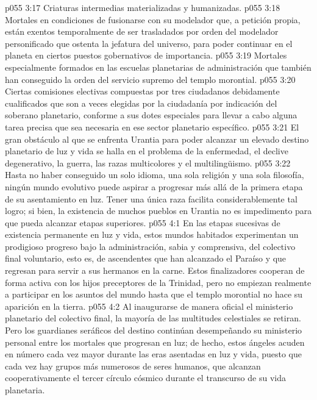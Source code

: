 \vs p055 3:17 Criaturas intermedias materializadas y humanizadas.
\vs p055 3:18 Mortales en condiciones de fusionarse con su modelador que, a petición propia, están exentos temporalmente de ser trasladados por orden del modelador personificado que ostenta la jefatura del universo, para poder continuar en el planeta en ciertos puestos gobernativos de importancia.
\vs p055 3:19 Mortales especialmente formados en las escuelas planetarias de administración que también han conseguido la orden del servicio supremo del templo morontial.
\vs p055 3:20 Ciertas comisiones electivas compuestas por tres ciudadanos debidamente cualificados que son a veces elegidas por la ciudadanía por indicación del soberano planetario, conforme a sus dotes especiales para llevar a cabo alguna tarea precisa que sea necesaria en ese sector planetario específico.
\vs p055 3:21 \pc El gran obstáculo al que se enfrenta Urantia para poder alcanzar un elevado destino planetario de luz y vida se halla en el problema de la enfermedad, el declive degenerativo, la guerra, las razas multicolores y el multilingüismo.
\vs p055 3:22 Hasta no haber conseguido un solo idioma, una sola religión y una sola filosofía, ningún mundo evolutivo puede aspirar a progresar más allá de la primera etapa de su asentamiento en luz. Tener una única raza facilita considerablemente tal logro; si bien, la existencia de muchos pueblos en Urantia no es impedimento para que pueda alcanzar etapas superiores.
\vs p055 4:1 En las etapas sucesivas de existencia permanente en luz y vida, estos mundos habitados experimentan un prodigioso progreso bajo la administración, sabia y comprensiva, del colectivo final voluntario, esto es, de ascendentes que han alcanzado el Paraíso y que regresan para servir a sus hermanos en la carne. Estos finalizadores cooperan de forma activa con los hijos preceptores de la Trinidad, pero no empiezan realmente a participar en los asuntos del mundo hasta que el templo morontial no hace su aparición en la tierra.
\vs p055 4:2 Al inaugurarse de manera oficial el ministerio planetario del colectivo final, la mayoría de las multitudes celestiales se retiran. Pero los guardianes seráficos del destino continúan desempeñando su ministerio personal entre los mortales que progresan en luz; de hecho, estos ángeles acuden en número cada vez mayor durante las eras asentadas en luz y vida, puesto que cada vez hay grupos más numerosos de seres humanos, que alcanzan cooperativamente el tercer círculo cósmico durante el transcurso de su vida planetaria.
